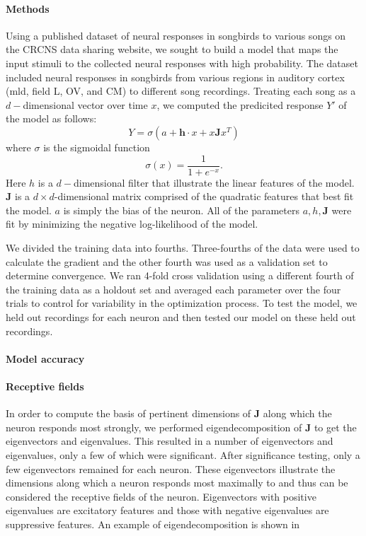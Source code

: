 \documentclass{article}
\begin{document}
\paragraph{Methods}
Using a published dataset of neural responses in songbirds to various songs on the CRCNS data sharing website, we sought to build a model that maps the input stimuli to the collected neural responses with high probability. The dataset included neural responses in songbirds from various regions in auditory cortex (mld, field L, OV, and CM) to different song recordings. Treating each song as a $d-$dimensional vector over time $x$, we computed the predicited response $Y'$ of the model as follows:
$$
Y = \sigma(a + \mathbf{h}\cdot x + x\mathbf{J}x^T)
$$ where $\sigma$ is the sigmoidal function
$$\sigma(x) = \frac{1}{1+e^{-x}}.$$ Here $h$ is a $d-$dimensional filter that illustrate the linear features of the model. $\mathbf{J}$ is a $d\times d$-dimensional matrix comprised of the quadratic features that best fit the model. $a$ is simply the bias of the neuron. All of the parameters $a, h, \mathbf{J}$ were fit by minimizing the negative log-likelihood of the model.

We divided the training data into fourths. Three-fourths of the data were used to calculate the gradient and the other fourth was used as a validation set to determine convergence. We ran 4-fold cross validation using a different fourth of the training data as a holdout set and averaged each parameter over the four trials to control for variability in the optimization process. To test the model, we held out recordings for each neuron and then tested our model on these held out recordings.

\paragraph{Model accuracy}

\paragraph{Receptive fields}
In order to compute the basis of pertinent dimensions of $\mathbf{J}$ along which the neuron responds most strongly, we performed eigendecomposition of $\mathbf{J}$ to get the eigenvectors and eigenvalues. This resulted in a number of eigenvectors and eigenvalues, only a few of which were significant. %
After significance testing, only a few eigenvectors remained for each neuron. These eigenvectors illustrate the dimensions along which a neuron responds most maximally to and thus can be considered the receptive fields of the neuron. Eigenvectors with positive eigenvalues are excitatory features and those with negative eigenvalues are suppressive features. An example of eigendecomposition is shown in %
\end{document}
